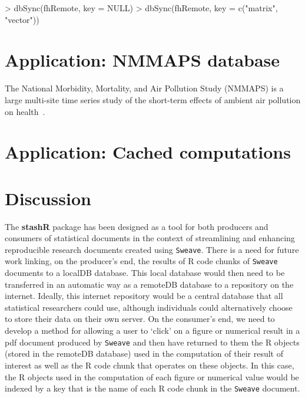 \documentclass{article}
\newcommand{\pkg}{\textbf}
\newcommand{\code}{\texttt}
\begin{document}
\begin{Schunk}
\begin{Sinput}
> dbSync(fhRemote, key = NULL)
> dbSync(fhRemote, key = c("matrix", "vector"))
\end{Sinput}
\end{Schunk}


\section{Application: NMMAPS database} 

The National Morbidity, Mortality, and Air Pollution Study (NMMAPS) is
a large multi-site time series study of the short-term effects of
ambient air pollution on health~\citep{nmmaps1,nmmaps2}.

\section{Application: Cached computations}


 
\section{Discussion}

The \pkg{stashR} package has been designed as a tool for both
producers and consumers of statistical documents in the context of
streamlining and enhancing reproducible research documents created
using \code{Sweave}. There is a need for future work linking, on the
producer's end, the results of R code chunks of \code{Sweave}
documents to a localDB database. This local database would then need
to be transferred in an automatic way as a remoteDB database to a
repository on the internet. Ideally, this internet repository would be
a central database that all statistical researchers could use,
although individuals could alternatively choose to store their data on
their own server. On the consumer's end, we need to develop a method
for allowing a user to `click' on a figure or numerical result in a
pdf document produced by \code{Sweave} and then have returned to them
the R objects (stored in the remoteDB database) used in the
computation of their result of interest as well as the R code chunk
that operates on these objects. In this case, the R objects used in
the computation of each figure or numerical value would be indexed by
a key that is the name of each R code chunk in the \code{Sweave}
document.






\end{document}
